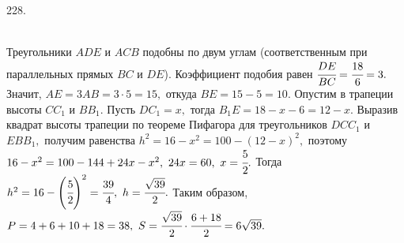 228. \begin{figure}[ht!]
\end{figure}\\
Треугольники $ADE$ и $ACB$ подобны по двум углам (соответственным при параллельных прямых $BC$ и $DE$). Коэффициент подобия равен $\cfrac{DE}{BC}=\cfrac{18}{6}=3.$ Значит, $AE=3AB=3\cdot5=15,$ откуда $BE=15-5=10.$ Опустим в трапеции высоты $CC_1$ и $BB_1.$ Пусть $DC_1=x,$ тогда $B_1E=18-x-6=12-x.$ Выразив квадрат высоты трапеции по теореме Пифагора для треугольников $DCC_1$ и $EBB_1,$ получим равенства $h^2=16-x^2=100-(12-x)^2,$ поэтому $16-x^2=100-144+24x-x^2,\ 24x=60,\ x=\cfrac{5}{2}.$ Тогда $h^2=16-\left(\cfrac{5}{2}\right)^2=\cfrac{39}{4},\ h=\cfrac{\sqrt{39}}{2}.$ Таким образом, $P=4+6+10+18=38,\ S=\cfrac{\sqrt{39}}{2}\cdot\cfrac{6+18}{2}=6\sqrt{39}.$\\
